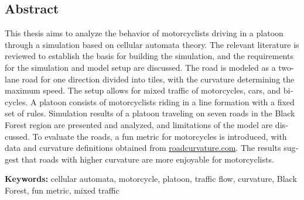 \begin{otherlanguage}{english}
\chapter*{Abstract}

This thesis aims to analyze the behavior of motorcyclists driving in a platoon through a simulation based on cellular automata theory. The relevant literature is reviewed to establish the basis for building the simulation, and the requirements for the simulation and model setup are discussed. The road is modeled as a two-lane road for one direction divided into tiles, with the curvature determining the maximum speed. The setup allows for mixed traffic of motorcycles, cars, and bicycles. A platoon consists of motorcyclists riding in a line formation with a fixed set of rules. Simulation results of a platoon traveling on seven roads in the Black Forest region are presented and analyzed, and limitations of the model are discussed. To evaluate the roads, a fun metric for motorcycles is introduced, with data and curvature definitions obtained from \href{www.roadcurvature.com}{roadcurvature.com}. The results suggest that roads with higher curvature are more enjoyable for motorcyclists.

\vfill
\noindent\textbf{Keywords:} cellular automata, motorcycle, platoon, traffic flow, curvature, Black Forest, fun metric, mixed traffic
\vfill
\end{otherlanguage}